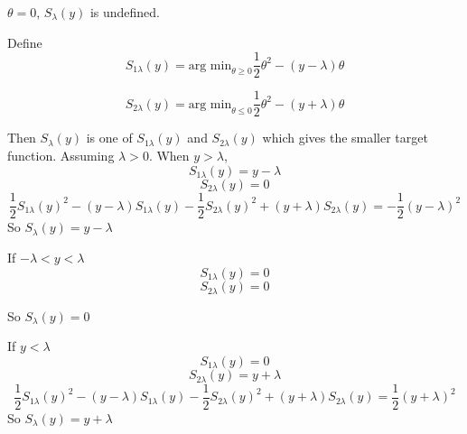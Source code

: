 \documentclass{article}
\begin{document}
$\theta=0$, $S_\lambda(y)$ is undefined.

Define
\[
S_{1\lambda}(y)=\textrm{arg min}_{\theta\geq0}\frac{1}{2}\theta^2-(y-\lambda)\theta
\]

\[
S_{2\lambda}(y)=\textrm{arg min}_{\theta\leq0}\frac{1}{2}\theta^2-(y+\lambda)\theta
\]

Then $S_\lambda(y)$ is one of $S_{1\lambda}(y)$ and $S_{2\lambda}(y)$  which gives the smaller target function.
Assuming $\lambda>0$. When $y>\lambda$,
\[
S_{1\lambda}(y)=y-\lambda
\]
\[
S_{2\lambda}(y)=0
\]
\[
\frac{1}{2}S_{1\lambda}(y)^2-(y-\lambda)S_{1\lambda}(y)-\frac{1}{2}S_{2\lambda}(y)^2+(y+\lambda)S_{2\lambda}(y)=-\frac{1}{2}(y-\lambda)^2
\]
So $S_{\lambda}(y)=y-\lambda$

If $-\lambda<y<\lambda$
\[
S_{1\lambda}(y)=0
\]
\[
S_{2\lambda}(y)=0
\]

So $S_{\lambda}(y)=0$

If $y<\lambda$
\[
S_{1\lambda}(y)=0
\]
\[
S_{2\lambda}(y)=y+\lambda
\]
\[
\frac{1}{2}S_{1\lambda}(y)^2-(y-\lambda)S_{1\lambda}(y)-\frac{1}{2}S_{2\lambda}(y)^2+(y+\lambda)S_{2\lambda}(y)=\frac{1}{2}(y+\lambda)^2
\]
So $S_{\lambda}(y)=y+\lambda$
\end{document}

